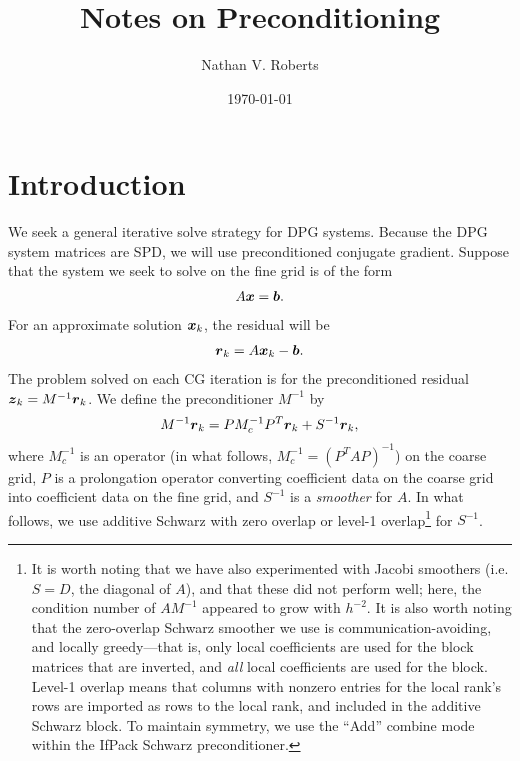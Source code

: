 \documentclass[11pt]{amsart}
\title{Notes on Preconditioning}
\author{Nathan V. Roberts}
\date{\today}
\begin{document}
\maketitle

\section{Introduction}
We seek a general iterative solve strategy for DPG systems.  Because the DPG system matrices are SPD, we will use preconditioned conjugate gradient.  Suppose that the system we seek to solve on the fine grid is of the form
\begin{align*}
A \boldsymbol{x} = \boldsymbol{b}.
\end{align*}
For an approximate solution $\boldsymbol{x}_k$, the residual will be
\begin{align*}
\boldsymbol{r}_k = A \boldsymbol{x}_k - \boldsymbol{b}.
\end{align*}
The problem solved on each CG iteration is for the preconditioned residual $\boldsymbol{z}_k = M^{-1}\boldsymbol{r}_k$.  We define the preconditioner $M^{-1}$ by
\begin{align*}
M^{-1}\boldsymbol{r}_k = P M_c^{-1} P^T \boldsymbol{r}_k + S^{-1}\boldsymbol{r}_k,
\end{align*}
where $M_c^{-1}$ is an operator (in what follows, $M_c^{-1} = (P^T A P)^{-1}$) on the coarse grid, $P$ is a prolongation operator converting coefficient data on the coarse grid into coefficient data on the fine grid, and $S^{-1}$ is a \emph{smoother} for $A$.  In what follows, we use additive Schwarz with zero overlap or level-1 overlap\footnote{It is worth noting that we have also experimented with Jacobi smoothers (i.e. $S=D$, the diagonal of $A$), and that these did not perform well; here, the condition number of $AM^{-1}$ appeared to grow with $h^{-2}$.  It is also worth noting that the zero-overlap Schwarz smoother we use is communication-avoiding, and locally greedy---that is, only local coefficients are used for the block matrices that are inverted, and \emph{all} local coefficients are used for the block.  Level-1 overlap means that columns with nonzero entries for the local rank's rows are imported as rows to the local rank, and included in the additive Schwarz block.  To maintain symmetry, we use the ``Add'' combine mode within the IfPack Schwarz preconditioner.} for $S^{-1}$.
\end{document}

